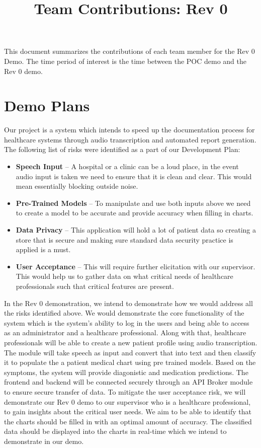 \documentclass{article}
\title{Team Contributions: Rev 0\\\progname}
\author{\authname}
\date{}
\begin{document}
\maketitle

This document summarizes the contributions of each team member for the Rev 0
Demo.  The time period of interest is the time between the POC demo and the Rev
0 demo.

\section{Demo Plans}

Our project is a system which intends to speed up the documentation process for healthcare systems through audio transcription and automated report generation.\\

The following list of risks were identified as a part of our Development Plan:
\begin{itemize}
  \item \textbf{Speech Input} -- A hospital or a clinic can be a loud place, in the event audio input is taken we need to ensure that it is clean and clear. This would mean essentially blocking outside noise. 
  \item \textbf{Pre-Trained Models} -- To manipulate and use both inputs above we need to create a model to be accurate and provide accuracy when filling in charts. 
  \item \textbf{Data Privacy} -- This application will hold a lot of patient data so creating a store that is secure and making sure standard data security practice is applied is a must.
  \item \textbf{User Acceptance} -- This will require further elicitation with our supervisor. This would help us to gather data on what critical needs of healthcare professionals such that critical features are present. 
\end{itemize}


In the Rev 0 demonstration, we intend to demonstrate how we would address all the risks identified above. We would demonstrate the core functionality of the system which is the system's ability to log in the users and being able to access as an administrator and a healthcare professional. Along with that, healthcare professionals will be able to create a new patient profile using audio transcription. The module will take speech as input and convert that into text and then classify it to populate the a patient medical chart using pre trained models. Based on the symptoms, the system will provide diagonistic and medication predictions. The frontend and backend will be connected securely through an API Broker module to ensure secure transfer of data. To mitigate the user acceptance risk, we will demonstrate our Rev 0 demo to our supervisor who is a healthcare professional, to gain insights about the critical user needs. We aim to be able to identify that the charts should be filled in with an optimal amount of accuracy. The classified data should be displayed into the charts in real-time which we intend to demonstrate in our demo. \\
\end{document}
